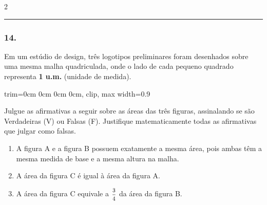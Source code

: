 \documentclass[twoside, 10pt, a4paper]{article}
\newlength{\espacoPreQuestao}\setlength{\espacoPreQuestao}{0.1cm}
\newlength{\espacoQuestao}\setlength{\espacoQuestao}{0.2cm}
\newlength{\espacoAlt}\setlength{\espacoAlt}{0.2cm}
\begin{document}
\begin{multicols*}{2}
\noindent\textcolor{CorLinha}{\rule{\linewidth}{0.5pt}} 
\par\vspace{\espacoPreQuestao}
\subsubsection*{14.} Em um estúdio de design, três logotipos preliminares foram desenhados sobre uma mesma malha quadriculada, onde o lado de cada pequeno quadrado representa \textbf{1 u.m.} (unidade de medida).

\begin{center}
\begin{adjustbox}{trim=0cm 0cm 0cm 0cm, clip, max width=0.9\linewidth}
\end{adjustbox}
\end{center}

Julgue as afirmativas a seguir sobre as áreas das três figuras, assinalando se são Verdadeiras (V) ou Falsas (F). Justifique matematicamente todas as afirmativas que julgar como falsas.
\begin{enumerate}[label=\Roman*., itemsep=\espacoAlt]
    \item A figura A e a figura B possuem exatamente a mesma área, pois ambas têm a mesma medida de base e a mesma altura na malha.
    \item A área da figura C é igual à área da figura A.
    \item A área da figura C equivale a $ \mfrac{3}{4} $ da área da figura B.
\end{enumerate}
\par\vspace{\espacoQuestao}


\end{multicols*}
\end{document}
